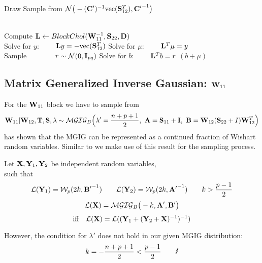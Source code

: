 \begin{algorithm}[]
	\caption{Draw Sample from $\mathcal{N}\big(-(\mathbf{C'})^{-1} \text{vec}(\mathbf{S}_{12}^T), \mathbf{C'}^{-1}\big)$}\label{alg:MN_sampler}
	\begin{algorithmic}
		\\
		\State Compute $\mathbf{L} \gets BlockChol(\mathbf{W}_{11}^{-1}, \mathbf{S}_{22}, \mathbf{D})$
		\\
		\State Solve for $y$: $\qquad \mathbf{L}y=-\text{vec}(\mathbf{S}_{12}^T) $ 
		\State Solve for $\mu$: $\qquad \mathbf{L}^T\mu=y$
		\\
		\State Sample $\qquad\quad\ \  r \sim \mathcal{N}(0,\mathbf{I}_{pq})$
		\State Solve for $b$: $\qquad \mathbf{L}^T b=r$
		\State
		\Return $(b+\mu)$
		\EndFunction
	\end{algorithmic}
\end{algorithm}


\subsection{Matrix Generalized Inverse Gaussian: $\mathbf{W}_{11}$}
\label{sample_MGIG}
For the $\mathbf{W}_{11}$ block we have to sample from
$$
\matr{W}_{11} | \matr{W}_{12}, \matr{T}, \matr{S}, \lambda \sim 
\mathcal{MGIG}_B
\Big(
\lambda' = \frac{n+p+1}{2}, \ 
\matr{A} = \matr{S}_{11}+\matr{I},\  
\matr{B} = \matr{W}_{12}(\matr{S}_{22}+I)\matr{W}_{12}^T
\Big)
$$
\citet{bernadac_random_1995} has shown that the \gls{MGIG} can be represented as a continued fraction of Wishart random variables.  
Similar to \citet{kaufmann2017semi} we make use of this result for the sampling process.
\begin{tcolorbox}[colback=yellow!5!white,colframe=yellow!75!black]
	\begin{theorem_51but}
		Let $\mathbf{X}, \mathbf{Y}_1, \mathbf{Y}_2$ be independent random variables,
		\\
		such that
		$$
		\mathcal{L}(\mathbf{Y}_1) = \mathcal{W}_p(2k, \mathbf{B'}^{-1})
		\quad \quad
		\mathcal{L}(\mathbf{Y}_2) = \mathcal{W}_p(2k, \mathbf{A'}^{-1})
		\quad \quad
		k > \frac{p-1}{2}
		$$
		$$
		\mathcal{L}(\mathbf{X}) = \mathcal{MGIG}_B\big(-k, \mathbf{A'}, \mathbf{B'} \big)
		$$
		$$
		\text{iff} \quad \mathcal{L}(\mathbf{X}) = \mathcal{L}((\mathbf{Y}_1 + (\mathbf{Y}_2 + \mathbf{X})^{-1})^{-1})
		$$
	\end{theorem_51but}
\end{tcolorbox}
However, the condition for $\lambda'$ does not hold in our given MGIG distribution:
$$
k = -\frac{n+p+1}{2} < \frac{p-1}{2} \qquad \text{\Lightning}
$$

